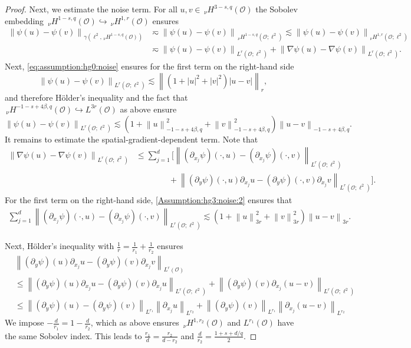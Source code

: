 \documentclass[reqno]{amsart}
\newcommand{\sO}{\mathscr{O}}
\newcommand{\1}{\mathbf{1}}
\newcommand{\nH}{\ensuremath{\,_\nu H}}
\newcommand{\bpsn}[1]{\ensuremath{\nH^{#1}(\sO)}}
\newcommand{\nrm}[1]{\left\lVert #1 \right\rVert}
\begin{document}
\begin{proof}
    Next, we estimate the noise term. For all $u,v\in \bpsn{3-s,q}$ the Sobolev embedding $\bpsn{1-s,q}\hookrightarrow\bpsn{1,r}$ ensures  
		 	\[\begin{aligned}
		 	\nrm{\psi(u)-\psi(v)}_{\gamma(\ell^2, \nH^{1-s,q}(\sO))}&\eqsim\nrm{\psi(u)-\psi(v)}_{\nH^{1-s,q}(\sO;\ell^2)}
            \lesssim \nrm{\psi(u)-\psi(v)}_{_\nu H^{1,r}(\sO;\ell^2)}\\
		 	&\eqsim \nrm{\psi(u)-\psi(v)}_{L^r(\sO;\ell^2)}+\nrm{\nabla\psi(u)-\nabla\psi(v)}_{L^r(\sO;\ell^2)}.
		 \end{aligned}\]
        Next, \eqref{eq:assumption:hg0:noise} ensures for the first term on the right-hand side 
		 \[\nrm{\psi(u)-\psi(v)}_{L^r(\sO;\ell^2)}\lesssim \nrm{(1+|u|^2+|v|^2)|u-v|}_r,\]
		 and therefore Hölder's inequality and the fact that $\bpsn{-1-s+4\beta,q}\hookrightarrow L^{3r}(\sO)$ as above ensure
		 \[\nrm{\psi(u)-\psi(v)}_{L^r(\sO;\ell^2)} \lesssim (1+\nrm{u}^2_{-1-s+4\beta,q}+\nrm{v}_{-1-s+4\beta,q}^2)\nrm{u-v}_{-1-s+4\beta,q}.\]
          It remains to estimate the spatial-gradient-dependent term. Note that 
		 \[\begin{aligned}
		 	\nrm{\nabla\psi(u)-\nabla\psi(v)}_{L^r(\sO;\ell^2)}&\le \sum_{j=1}^d\Big[\nrm{(\partial_{x_j}\psi)(\cdot, u)-(\partial_{x_j}\psi)(\cdot,v)}_{L^r(\sO;\ell^2)}\\
		 	&\qquad \qquad +\nrm{(\partial_y\psi)(\cdot, u)\partial_{x_j}u-(\partial_y\psi)(\cdot,v)\partial_{x_j}v}_{L^r(\sO;\ell^2)}\Big].
		 \end{aligned}\]
         For the first term on the right-hand side, \eqref{Assumption:hg3:noise:2} ensures that 
		 \[\begin{aligned}
		 	\sum_{j=1}^d\nrm{(\partial_{x_j}\psi)(\cdot, u)-(\partial_{x_j}\psi)(\cdot,v)}_{L^r(\sO;\ell^2)}\lesssim (1+\nrm{u}_{3r}^2+\nrm{v}_{3r}^2)\nrm{u-v}_{3r}.
		 \end{aligned}\]

         Next, Hölder's inequality with $\frac{1}{r}=\frac{1}{r_1}+\frac{1}{r_2}$ ensures
         \[\begin{aligned}
             &\nrm{(\partial_y \psi)(u)\partial_{x_j} u - (\partial_y\psi)(v)\partial_{x_j}v}_{L^r(\sO)}\\
		 	&\le \nrm{(\partial_y\psi)(u)\partial_{x_j}u-(\partial_y\psi)(v)\partial_{x_j}u}_{L^r(\sO;\ell^2)}+\nrm{(\partial_y\psi)(v)\partial_{x_j}(u-v)}_{L^r(\sO;\ell^2)}\\
            &\le \nrm{(\partial_y\psi)(u)-(\partial_y \psi)(v)}_{L^{r_1}} \nrm{\partial_{x_j}u}_{L^{r_2}} + \nrm{(\partial_y\psi)(v)}_{L^{r_1}}\nrm{\partial_{x_j}(u-v)}_{L^{r_2}}
         \end{aligned}\]
         We impose $-\frac{d}{r_1}=1-\frac{d}{r_2}$, which as above ensures  $\bpsn{1,r_2}$ and $L^{r_1}(\sO)$ have the same Sobolev index.  This leads to $\frac{r_1}{d}= \frac{r_2}{d-r_2}$ and $\frac{d}{r_2}=\frac{1+s+d/q}{2}$. 


\end{proof}
\end{document}
